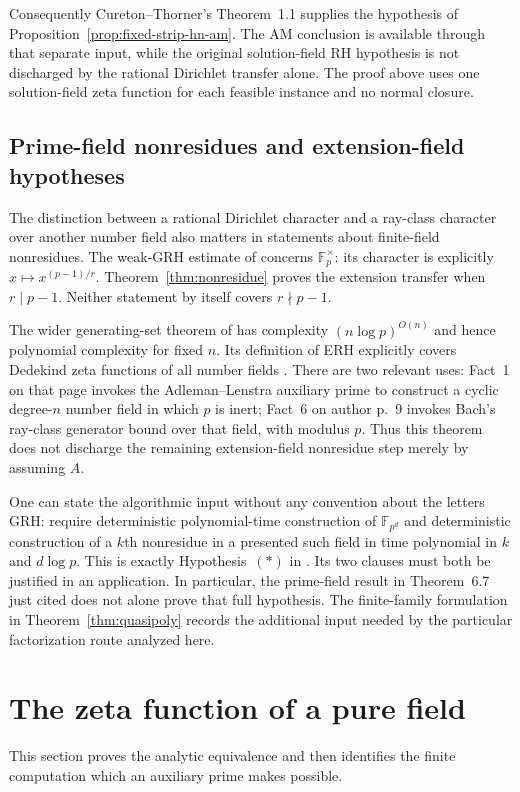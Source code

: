 \documentclass[11pt]{article}
\theoremstyle{definition}
\theoremstyle{remark}
\begin{document}
Consequently Cureton--Thorner's Theorem~1.1 supplies the hypothesis
of Proposition~\ref{prop:fixed-strip-hn-am}.  The AM conclusion is
available through that separate input, while the original
solution-field RH hypothesis is not discharged by the rational
Dirichlet transfer alone.  The proof above uses one solution-field
zeta function for each feasible instance and no normal closure.

\subsection{Prime-field nonresidues and extension-field hypotheses}
The distinction between a rational Dirichlet character and a ray-class
character over another number field also matters in statements about
finite-field nonresidues.  The weak-GRH estimate of
\citet[Theorem~6.7, p.~8]{BhargavaEtAl2017} concerns
$\mathbb F_p^\times$: its character is explicitly
$x\mapsto x^{(p-1)/r}$.  Theorem~\ref{thm:nonresidue} proves the
extension transfer when $r\mid p-1$.  Neither statement by itself
covers $r\nmid p-1$.

The wider generating-set theorem of
\citet[author pp.~2--3]{BuchmannShoup1996} has complexity
$(n\log p)^{O(n)}$ and hence polynomial complexity for fixed $n$.
Its definition of ERH explicitly covers Dedekind zeta functions of
all number fields \citep[author p.~5]{BuchmannShoup1996}.
There are two relevant uses: Fact~1 on that page invokes the
Adleman--Lenstra auxiliary prime to construct a cyclic degree-$n$
number field in which $p$ is inert; Fact~6 on author p.~9 invokes
Bach's ray-class generator bound over that field, with modulus $p$.
Thus this theorem does not discharge the remaining extension-field
nonresidue step merely by assuming $A$.

One can state the algorithmic input without any convention about the
letters GRH: require deterministic polynomial-time construction of
$\mathbb F_{p^d}$ and deterministic construction of a $k$th nonresidue
in a presented such field in time polynomial in $k$ and $d\log p$.
This is exactly Hypothesis~$(*)$ in
\citet[\S1.1, p.~3]{Guo2017Thesis}.  Its two clauses must both be
justified in an application.  In particular, the prime-field result
in Theorem~6.7 just cited does not alone prove that full hypothesis.
The finite-family formulation in Theorem~\ref{thm:quasipoly}
records the additional input needed by the particular factorization
route analyzed here.

\section{The zeta function of a pure field}
This section proves the analytic equivalence and then identifies the
finite computation which an auxiliary prime makes possible.
\end{document}
